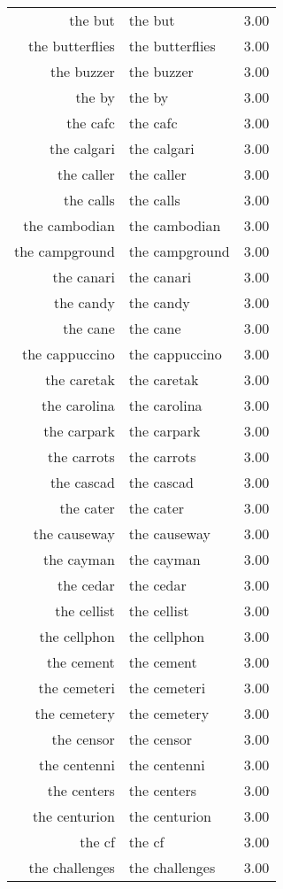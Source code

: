 \begin{table}[ht]
\begin{tabular}{rlr}
  the but & the but & 3.00 \\ 
  the butterflies & the butterflies & 3.00 \\ 
  the buzzer & the buzzer & 3.00 \\ 
  the by & the by & 3.00 \\ 
  the cafc & the cafc & 3.00 \\ 
  the calgari & the calgari & 3.00 \\ 
  the caller & the caller & 3.00 \\ 
  the calls & the calls & 3.00 \\ 
  the cambodian & the cambodian & 3.00 \\ 
  the campground & the campground & 3.00 \\ 
  the canari & the canari & 3.00 \\ 
  the candy & the candy & 3.00 \\ 
  the cane & the cane & 3.00 \\ 
  the cappuccino & the cappuccino & 3.00 \\ 
  the caretak & the caretak & 3.00 \\ 
  the carolina & the carolina & 3.00 \\ 
  the carpark & the carpark & 3.00 \\ 
  the carrots & the carrots & 3.00 \\ 
  the cascad & the cascad & 3.00 \\ 
  the cater & the cater & 3.00 \\ 
  the causeway & the causeway & 3.00 \\ 
  the cayman & the cayman & 3.00 \\ 
  the cedar & the cedar & 3.00 \\ 
  the cellist & the cellist & 3.00 \\ 
  the cellphon & the cellphon & 3.00 \\ 
  the cement & the cement & 3.00 \\ 
  the cemeteri & the cemeteri & 3.00 \\ 
  the cemetery & the cemetery & 3.00 \\ 
  the censor & the censor & 3.00 \\ 
  the centenni & the centenni & 3.00 \\ 
  the centers & the centers & 3.00 \\ 
  the centurion & the centurion & 3.00 \\ 
  the cf & the cf & 3.00 \\ 
  the challenges & the challenges & 3.00 \\ 

\end{tabular}
\end{table}
